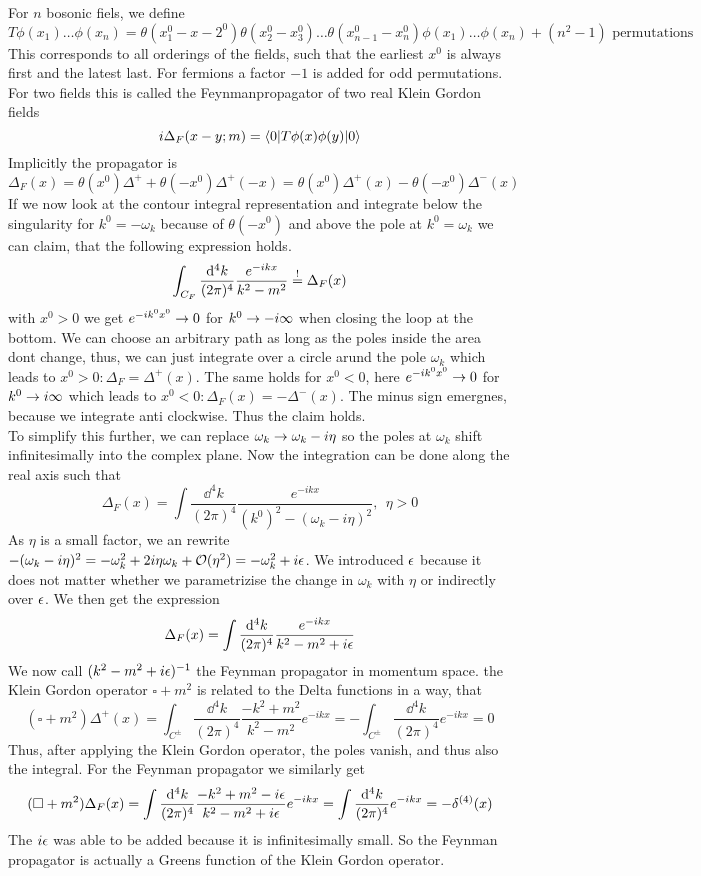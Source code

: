 For $n$ bosonic fiels, we define
\[ T \phi(x_1)\ldots \phi(x_n) = \theta(x_1^0-x-2^0)\theta(x_2^0-x_3^0)\ldots \theta(x_{n-1}^0-x_n^0) \phi(x_1)\ldots \phi(x_n) + (n^2-1)\textrm{~permutations}\]
This corresponds to all orderings of the fields, such that the earliest $x^0$ is always first and the latest last.
For fermions a factor $-1$ is added for odd permutations.
For two fields this is called the Feynmanpropagator of two real Klein Gordon fields
\[ i \Delta_F(x-y;m) = \langle 0 | T \phi(x) \phi(y) | 0 \rangle\]
Implicitly the propagator is
\[ \Delta_F(x) = \theta(x^0) \Delta^+ + \theta(-x^0)\Delta^+(-x) = \theta(x^0) \Delta^+(x) - \theta(-x^0) \Delta^-(x)\]
If we now look at the contour integral representation and integrate below the singularity for $k^0 = -\omega_k$ because of $\theta(-x^0)$ and above the pole at $k^0 = \omega_k$ we can claim, that the following expression holds.
\[ \int_{C_F} \frac{ {\rm d}^4 k}{(2\pi)^4} \frac{ e^{-ikx}}{k^2-m^2} \overset{!}{=} \Delta_F(x)\]
with $x^0 > 0$ we get $e^{-ik^0x^0} \rightarrow 0$ for $k^0 \rightarrow -i\infty$ when closing the loop at the bottom. 
We can choose an arbitrary path as long as the poles inside the area dont change, thus, we can just integrate over a circle arund the pole $\omega_k$ which leads to $x^0 > 0: \Delta_F = \Delta^+(x)$.
The same holds for $x^0 < 0$, here $e^{-ik^0x^0} \rightarrow 0$ for $k^0 \rightarrow i \infty$ which leads to $x^0 < 0: \Delta_F(x) = - \Delta^-(x)$. 
The minus sign emergnes, because we integrate anti clockwise.
Thus the claim holds.\\
To simplify this further, we can replace $\omega_k \rightarrow \omega_k - i \eta$ so the poles at $\omega_k$ shift infinitesimally into the complex plane.
Now the integration can be done along the real axis such that
\[ \Delta_F(x) = \int \frac{ \dd^4 k}{(2\pi)^4} \frac{ e^{-ikx}}{(k^0)^2 - ( \omega_k - i \eta)^2}, ~~\eta > 0\]
As $\eta$ is a small factor, we an rewrite $-(\omega_k-i\eta)^2 = -\omega_k^2 + 2 i \eta\omega_k + \mathcal{O}(\eta^2) = - \omega_k^2  +i \epsilon$. We introduced $\epsilon$ because it does not matter whether we parametrizise the change in $\omega_k$ with $\eta$ or indirectly over $\epsilon$.
We then get the expression
\[ \Delta_F(x) = \int \frac{{\rm d} ^4 k}{(2\pi)^4} \frac{ e^{-ikx}}{k^2 - m^2 + i \epsilon}\]
We now call $(k^2 - m^2 + i \epsilon)^{-1}$ the Feynman propagator in momentum space.
the Klein Gordon operator $\square + m^2$ is related to the Delta functions in a way, that
\[ (\square +m^2) \Delta^+(x) = \int_{C^\pm} \frac{\dd^4 k}{(2\pi)^4} \frac{ -k^2 + m^2}{k^2 - m^2} e^{-ikx} = - \int_{C^\pm} \frac{\dd^4 k}{(2\pi)^4} e^{-ikx} = 0\]
Thus, after applying the Klein Gordon operator, the poles vanish, and thus also the integral.
For the Feynman propagator we similarly get
\[ ( \square + m^2) \Delta_F(x) = \int \frac{{\rm d} ^4 k}{(2\pi)^4}\frac{-k^2 + m^2 -i\epsilon}{k^2-m^2+i\epsilon} e^{-ikx}  = \int \frac{{\rm d}^4 k}{(2\pi)^4} e^{-ikx} = - \delta^{(4)}(x)\]
The $i\epsilon$ was able to be added because it is infinitesimally small. 
So the Feynman propagator is actually a Greens function of the Klein Gordon operator.

